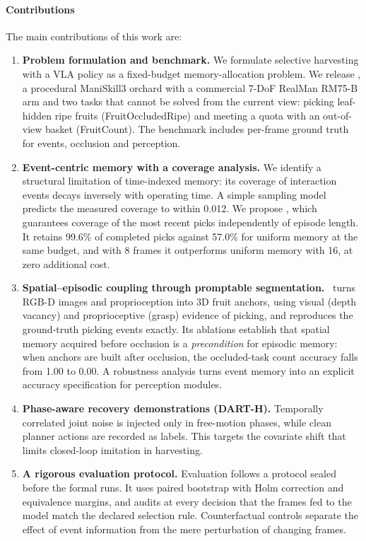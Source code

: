 \paragraph{Contributions} The main contributions of this work are:
\begin{enumerate}
\item \textbf{Problem formulation and benchmark.} We formulate selective harvesting with a VLA policy as a fixed-budget memory-allocation problem. We release \bench, a procedural ManiSkill3 orchard with a commercial 7-DoF RealMan RM75-B arm and two tasks that cannot be solved from the current view: picking leaf-hidden ripe fruits (FruitOccludedRipe) and meeting a quota with an out-of-view basket (FruitCount). The benchmark includes per-frame ground truth for events, occlusion and perception.
\item \textbf{Event-centric memory with a coverage analysis.} We identify a structural limitation of time-indexed memory: its coverage of interaction events decays inversely with operating time. A simple sampling model predicts the measured coverage to within 0.012. We propose \pekm, which guarantees coverage of the most recent picks independently of episode length. It retains 99.6\% of completed picks against 57.0\% for uniform memory at the same budget, and with 8 frames it outperforms uniform memory with 16, at zero additional cost.
\item \textbf{Spatial--episodic coupling through promptable segmentation.} \fdm\ turns RGB-D images and proprioception into 3D fruit anchors, using visual (depth vacancy) and proprioceptive (grasp) evidence of picking, and reproduces the ground-truth picking events exactly. Its ablations establish that spatial memory acquired before occlusion is a \emph{precondition} for episodic memory: when anchors are built after occlusion, the occluded-task count accuracy falls from 1.00 to 0.00. A robustness analysis turns event memory into an explicit accuracy specification for perception modules.
\item \textbf{Phase-aware recovery demonstrations (DART-H).} Temporally correlated joint noise is injected only in free-motion phases, while clean planner actions are recorded as labels. This targets the covariate shift that limits closed-loop imitation in harvesting.
\item \textbf{A rigorous evaluation protocol.} Evaluation follows a protocol sealed before the formal runs. It uses paired bootstrap with Holm correction and equivalence margins, and audits at every decision that the frames fed to the model match the declared selection rule. Counterfactual controls separate the effect of event information from the mere perturbation of changing frames.
\end{enumerate}

